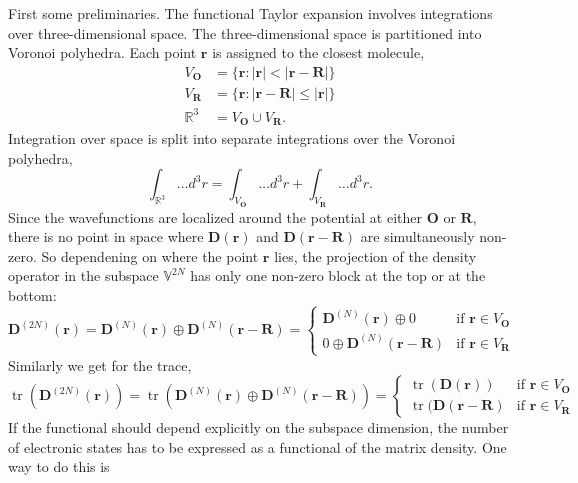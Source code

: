 \documentclass[journal=jacsat,manuscript=article]{achemso}
\DeclareMathOperator{\tr}{tr}
\newcommand\m[1]{\mathbf{#1}}
\renewcommand\vec[1]{\mathbf{#1}}
\begin{document}
First some preliminaries.
The functional Taylor expansion involves integrations over three-dimensional space.
The three-dimensional space is partitioned into Voronoi polyhedra. Each point $\vec{r}$ is assigned to the closest molecule,
\begin{align}
  V_{\vec{O}} &= \{\vec{r}: \vert \vec{r} \vert < \vert \vec{r} - \vec{R} \vert \} \\
  V_{\vec{R}} &= \{\vec{r}: \vert \vec{r} - \vec{R} \vert \leq \vert \vec{r} \vert \} \\
  \mathbb{R}^3 &= V_{\vec{O}} \cup V_{\vec{R}}.
\end{align}
Integration over space is split into separate integrations over the Voronoi polyhedra,
\begin{equation}
 \int_{\mathbb{R}^3} \ldots d^3\!r = \int_{V_{\vec{O}}} \ldots d^3\!r + \int_{V_{\vec{R}}} \ldots d^3\!r.
\end{equation}
Since the wavefunctions are localized around the potential at either $\vec{O}$ or $\vec{R}$, there is no point in space where $\m{D}(\vec{r})$ and $\m{D}(\vec{r}-\vec{R})$ are simultaneously non-zero. So dependening on where the point $\vec{r}$ lies, the projection of the density operator in the subspace $\mathbb{V}^{2N}$ has only one non-zero block at the top or at the bottom:
\begin{equation}
  \m{D}^{(2N)}(\vec{r}) = \m{D}^{(N)}(\vec{r}) \oplus \m{D}^{(N)}(\vec{r}-\vec{R}) =
  \begin{cases}
    \m{D}^{(N)}(\vec{r}) \oplus 0 & \text{if } \vec{r} \in V_{\vec{O}} \\
    0 \oplus \m{D}^{(N)}(\vec{r}-\vec{R}) & \text{if } \vec{r} \in V_{\vec{R}} \label{eqn:D_split}
  \end{cases}
\end{equation}
Similarly we get for the trace,
\begin{equation}
  \tr\left(\m{D}^{(2N)}(\vec{r}) \right)
  =
  \tr\left(\m{D}^{(N)}(\vec{r}) \oplus \m{D}^{(N)}(\vec{r}-\vec{R}) \right)
  =
  \begin{cases}
    \tr(\m{D}(\vec{r})) & \text{if } \vec{r} \in V_{\vec{O}} \\
    \tr(\m{D}(\vec{r}-\vec{R}) & \text{if } \vec{r} \in V_{\vec{R}} \label{eqn:tr_split}
  \end{cases}
\end{equation}
If the functional should depend explicitly on the subspace dimension, the number of electronic states has to be expressed as a functional of the matrix density. One way to do this is
\end{document}
